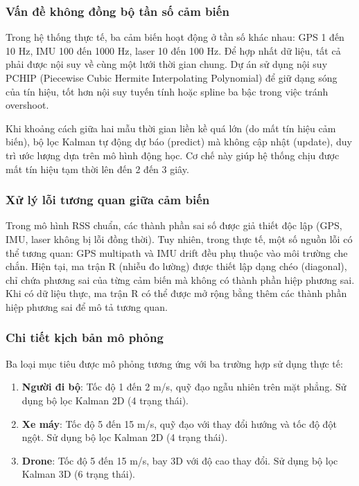 \subsubsection{Vấn đề không đồng bộ tần số cảm biến}

\hspace{0.5cm} Trong hệ thống thực tế, ba cảm biến hoạt động ở tần số khác nhau: GPS 1 đến 10 Hz, IMU 100 đến 1000 Hz, laser 10 đến 100 Hz. Để hợp nhất dữ liệu, tất cả phải được nội suy về cùng một lưới thời gian chung. Dự án sử dụng nội suy PCHIP (Piecewise Cubic Hermite Interpolating Polynomial) để giữ dạng sóng của tín hiệu, tốt hơn nội suy tuyến tính hoặc spline ba bậc trong việc tránh overshoot.

Khi khoảng cách giữa hai mẫu thời gian liền kề quá lớn (do mất tín hiệu cảm biến), bộ lọc Kalman tự động dự báo (predict) mà không cập nhật (update), duy trì ước lượng dựa trên mô hình động học. Cơ chế này giúp hệ thống chịu được mất tín hiệu tạm thời lên đến 2 đến 3 giây.

\subsubsection{Xử lý lỗi tương quan giữa cảm biến}

\hspace{0.5cm} Trong mô hình RSS chuẩn, các thành phần sai số được giả thiết độc lập (GPS, IMU, laser không bị lỗi đồng thời). Tuy nhiên, trong thực tế, một số nguồn lỗi có thể tương quan: GPS multipath và IMU drift đều phụ thuộc vào môi trường che chắn. Hiện tại, ma trận R (nhiễu đo lường) được thiết lập dạng chéo (diagonal), chỉ chứa phương sai của từng cảm biến mà không có thành phần hiệp phương sai. Khi có dữ liệu thực, ma trận R có thể được mở rộng bằng thêm các thành phần hiệp phương sai để mô tả tương quan.

\subsubsection{Chi tiết kịch bản mô phỏng}

\hspace{0.5cm} Ba loại mục tiêu được mô phỏng tương ứng với ba trường hợp sử dụng thực tế:

\begin{enumerate}
    \item \textbf{Người đi bộ}: Tốc độ 1 đến 2 m/s, quỹ đạo ngẫu nhiên trên mặt phẳng. Sử dụng bộ lọc Kalman 2D (4 trạng thái).
    \item \textbf{Xe máy}: Tốc độ 5 đến 15 m/s, quỹ đạo với thay đổi hướng và tốc độ đột ngột. Sử dụng bộ lọc Kalman 2D (4 trạng thái).
    \item \textbf{Drone}: Tốc độ 5 đến 15 m/s, bay 3D với độ cao thay đổi. Sử dụng bộ lọc Kalman 3D (6 trạng thái).
\end{enumerate}

